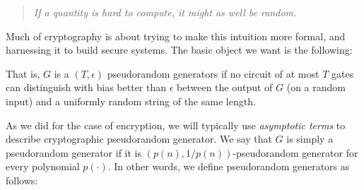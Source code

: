 \begin{quote}
\emph{If a quantity is hard to compute, it might as well be random.}
\end{quote}

Much of cryptography is about trying to make this intuition more formal,
and harnessing it to build secure systems. The basic object we want is
the following:

\hypertarget{prgdefconcrete}{}

That is, \(G\) is a \((T,\epsilon)\) pseudorandom generators if no
circuit of at most \(T\) gates can distinguish with bias better than
\(\epsilon\) between the output of \(G\) (on a random input) and a
uniformly random string of the same length.

As we did for the case of encryption, we will typically use
\emph{asymptotic terms} to describe cryptographic pseudorandom
generator. We say that \(G\) is simply a pseudorandom generator if it is
\((p(n),1/p(n))\)-pseudorandom generator for every polynomial
\(p(\cdot)\). In other words, we define pseudorandom generators as
follows:

\hypertarget{prgdef}{}

